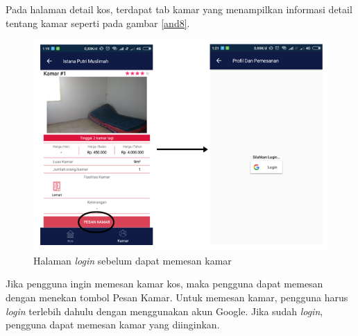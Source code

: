 		Pada halaman detail kos, terdapat tab kamar yang menampilkan informasi detail tentang kamar seperti pada gambar \ref{and8}. 
		
		\begin{figure}[H]
			\centering
			\includegraphics[width=\textwidth]{gambar/and/and4}
			\caption{Halaman \textit{login} sebelum dapat memesan kamar}
			\label{and9}
		\end{figure}
	
		Jika pengguna ingin memesan kamar kos, maka pengguna dapat memesan dengan menekan tombol Pesan Kamar. Untuk memesan kamar, pengguna harus \textit{login }terlebih dahulu dengan menggunakan akun Google. Jika sudah \textit{login}, pengguna dapat memesan kamar yang diinginkan. 
		

